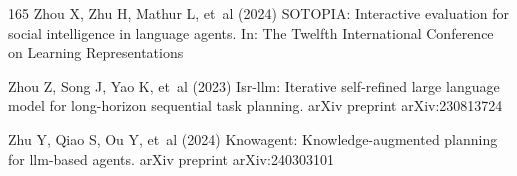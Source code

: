 \documentclass[sn-basic, Numbered]{sn-jnl}%
\theoremstyle{thmstyleone}%
\theoremstyle{thmstyletwo}%
\theoremstyle{thmstylethree}%
\begin{document}
\begin{thebibliography}{165}
Zhou X, Zhu H, Mathur L, et~al (2024{}) {SOTOPIA}: Interactive evaluation for social intelligence in language agents. In: The Twelfth International Conference on Learning Representations

Zhou Z, Song J, Yao K, et~al (2023) Isr-llm: Iterative self-refined large language model for long-horizon sequential task planning. arXiv preprint arXiv:230813724

Zhu Y, Qiao S, Ou Y, et~al (2024) Knowagent: Knowledge-augmented planning for llm-based agents. arXiv preprint arXiv:240303101

\end{thebibliography}
\end{document}
